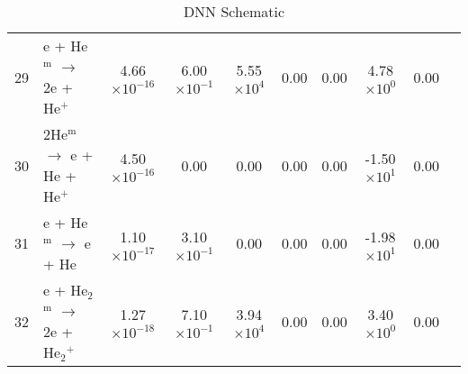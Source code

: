 \documentclass{article}
\begin{document}
\begin{table}[H]
{\begin{tabu}{clcccccccc}
      29 & e + He$^\text{m}$ $\rightarrow$ 2e + He$^{+}$ & 4.66$\times 10^{-16}$ & 6.00$\times 10^{-1}$ & 5.55$\times 10^{4}$ & 0.00 & 0.00 & 4.78$\times 10^{0}$ & 0.00 & \cite{ionin2007physics} \\
      30 & 2He$^\text{m}$ $\rightarrow$ e + He + He$^{+}$ & 4.50$\times 10^{-16}$ & 0.00 & 0.00 & 0.00 & 0.00 & -1.50$\times 10^{1}$ & 0.00 & \cite{ionin2007physics} \\
      31 & e + He$^\text{m}$ $\rightarrow$ e + He & 1.10$\times 10^{-17}$ & 3.10$\times 10^{-1}$ & 0.00 & 0.00 & 0.00 & -1.98$\times 10^{1}$ & 0.00 & \cite{ionin2007physics} \\
      32 & e + He$_2$$^\text{m}$ $\rightarrow$ 2e + He$_{2}$$^{+}$ & 1.27$\times 10^{-18}$ & 7.10$\times 10^{-1}$ & 3.94$\times 10^{4}$ & 0.00 & 0.00 & 3.40$\times 10^{0}$ & 0.00 & \cite{ionin2007physics} \\
    \end{tabu}
  }
  \caption{DNN Schematic}
\end{table}
\end{document}
